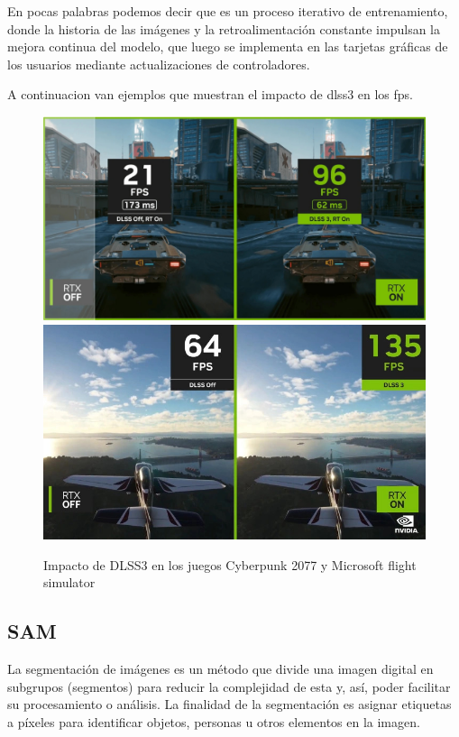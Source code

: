 \documentclass[runningheads]{llncs} %
\begin{document}
En pocas palabras podemos decir que es un proceso iterativo de entrenamiento, 
donde la historia de las imágenes y la retroalimentación constante impulsan 
la mejora continua del modelo, que luego se implementa en las tarjetas gráficas 
de los usuarios mediante actualizaciones de controladores. 

A continuacion van ejemplos que muestran el impacto de dlss3 en los fps.

\begin{figure}
    \centering
    \includegraphics[scale=0.15]{ej1-dlss3.jpg}
    \includegraphics[scale=0.32]{ej2-dlss3.jpg}
    \caption{Impacto de DLSS3 en los juegos Cyberpunk 2077 y 
    Microsoft flight simulator \cite{img1-dlss3}}
    \label{fig:ej1-dlss3}
\end{figure}
\newpage

\subsection{SAM}
La segmentación de imágenes es un método que divide una imagen digital 
en subgrupos (segmentos) para reducir la complejidad de esta y, así, 
poder facilitar su procesamiento o análisis. La finalidad de la segmentación 
es asignar etiquetas a píxeles para identificar objetos, personas u otros 
elementos en la imagen. 
\end{document}
